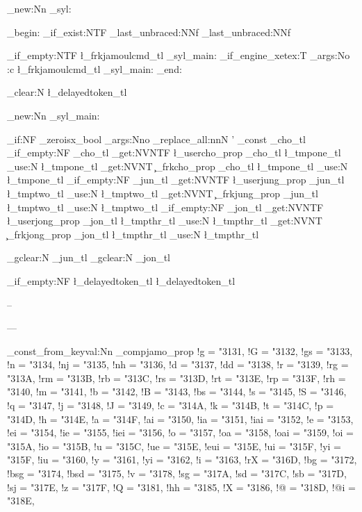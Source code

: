 \cs_new:Nn \build_syl:
{
  \group_begin:
    \cs_if_exist:NTF \hangulfontspec
  	{
  		\exp_last_unbraced:NNf \hangulfontspec [ \frkhangulfontfeature ] { \frkhangulfont }
  	}
  	{
  		\exp_last_unbraced:NNf \fontspec [ \frkhangulfontfeature ] { \frkhangulfont }
  	}

  	\tl_if_empty:NTF \l_frkjamoulcmd_tl
  	{
  		\build_syl_main:
  	}
  	{
  	  \sys_if_engine_xetex:T { \allowbreak }
  	  \exp_args:No \use:c { \l_frkjamoulcmd_tl } {
  	  	\build_syl_main:
  	  }
  	}
	\group_end:

	\tl_clear:N \l_delayedtoken_tl
}

\cs_new:Nn \build_syl_main:
{
	\bool_if:NF \opt_zeroisx_bool
	{
		\exp_args:Nno
		\regex_replace_all:nnN { ' } { \zero_const } \g_cho_tl
	}
	\tl_if_empty:NF \g_cho_tl
	{
		\prop_get:NVNTF \l_usercho_prop \g_cho_tl \l_tmpone_tl 
			{ \tl_use:N \l_tmpone_tl }
			{
				\prop_get:NVNT \c_frkcho_prop \g_cho_tl \l_tmpone_tl
				{ \tl_use:N \l_tmpone_tl }
			}
	}
	\tl_if_empty:NF \g_jun_tl
	{
		\prop_get:NVNTF \l_userjung_prop \g_jun_tl \l_tmptwo_tl 
			{ \tl_use:N \l_tmptwo_tl }
			{
				\prop_get:NVNT \c_frkjung_prop \g_jun_tl \l_tmptwo_tl
				{ \tl_use:N \l_tmptwo_tl }
			}
	}
	\tl_if_empty:NF \g_jon_tl 
	{
		\prop_get:NVNTF \l_userjong_prop \g_jon_tl \l_tmpthr_tl 
			{ \tl_use:N \l_tmpthr_tl }
			{
				\prop_get:NVNT \c_frkjong_prop \g_jon_tl \l_tmpthr_tl
				{ \tl_use:N \l_tmpthr_tl }
			}
	}

	\tl_gclear:N \g_jun_tl
	\tl_gclear:N \g_jon_tl

	\tl_if_empty:NF \l_delayedtoken_tl
	{
		\l_delayedtoken_tl
	}
}

\NewDocumentCommand \frdash { }
{
}

\NewDocumentCommand \frendash {}
{
	--
}

\NewDocumentCommand \fremdash {}
{
	---
}

\prop_const_from_keyval:Nn \my_compjamo_prop
{
	!g	= \char"3131,
	!G	= \char"3132,
	!gs	= \char"3133,
	!n	= \char"3134,
	!nj	= \char"3135,
	!nh	= \char"3136,
	!d	= \char"3137,
	!dd	= \char"3138,
	!r	= \char"3139,
	!rg	= \char"313A,
	!rm	= \char"313B,
	!rb	= \char"313C,
	!rs	= \char"313D,
	!rt	= \char"313E,
	!rp	= \char"313F,
	!rh	= \char"3140,
	!m	= \char"3141,
	!b	= \char"3142,
	!B	= \char"3143,
	!bs	= \char"3144,
	!s	= \char"3145,
	!S	= \char"3146,
	!q	= \char"3147,
	!j	= \char"3148,
	!J	= \char"3149,
	!c	= \char"314A,
	!k	= \char"314B,
	!t	= \char"314C,
	!p	= \char"314D,
	!h	= \char"314E,
	!a	= \char"314F,
	!ai	= \char"3150,
	!ia	= \char"3151,
	!iai	= \char"3152,
	!e	= \char"3153,
	!ei	= \char"3154,
	!ie	= \char"3155,
	!iei	= \char"3156,
	!o	= \char"3157,
	!oa	= \char"3158,
	!oai	= \char"3159,
	!oi	= \char"315A,
	!io	= \char"315B,
	!u	= \char"315C,
	!ue	= \char"315E,
	!eui	= \char"315E,
	!ui	= \char"315F,
	!yi	= \char"315F,
	!iu	= \char"3160,
	!y	= \char"3161,
	!yi	= \char"3162,
	!i	= \char"3163,
	!rX	= \char"316D,
	!bg	= \char"3172,
	!bsg	= \char"3174,
	!bsd	= \char"3175,
	!v	= \char"3178,
	!sg	= \char"317A,
	!sd	= \char"317C,
	!sb	= \char"317D,
	!sj	= \char"317E,
	!z	= \char"317F,
	!Q	= \char"3181,
	!hh	= \char"3185,
	!X	= \char"3186,
	!@ 	= \char"318D,
	!@i	= \char"318E,
}

